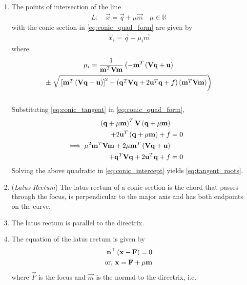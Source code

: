 \documentclass[journal,12pt,twocolumn]{IEEEtran}
\renewcommand\thesection{\arabic{section}}
\renewcommand\thesubsection{\thesection.\arabic{subsection}}
\begin{document}
\begin{enumerate}[label=\thesubsection.\arabic*.,ref=\thesubsection.\theenumi]
\item The points of intersection of the line 
\begin{align}
L: \quad \vec{x} = \vec{q} + \mu \vec{m} \quad \mu \in \mathbb{R}
\label{eq:conic_tangent}
\end{align}
with the conic section in \eqref{eq:conic_quad_form} are given by
\begin{align}
\vec{x}_i = \vec{q} + \mu_i \vec{m}
\label{eq:conic_tangent_pts}
\end{align}
%
where
{\tiny
\begin{multline}
\mu_i = \frac{1}
{
\mathbf{m}^T\mathbf{V}\mathbf{m}
}
\left(-\mathbf{m}^T\left(\mathbf{V}\mathbf{q}+\mathbf{u}\right)\right.
\\
\pm
\left.\sqrt{
{}\left[
\mathbf{m}^T\left(\mathbf{V}\mathbf{q}+\mathbf{u}\right)
\right]^2
-
\left(
\mathbf{q}^T\mathbf{V}\mathbf{q} + 2\mathbf{u}^T\mathbf{q} +f
\right)
\left(\mathbf{m}^T\mathbf{V}\mathbf{m}\right)
}
\right)
\label{eq:tangent_roots}
\end{multline}
}
\\
\solution 
Substituting \eqref{eq:conic_tangent}
in \eqref{eq:conic_quad_form}, 
\begin{align}
\left(\mathbf{q} + \mu \mathbf{m}\right)^T\mathbf{V}\left(\mathbf{q} + \mu \mathbf{m}\right)  
\\
+ 2 \mathbf{u}^T\left(\mathbf{q} + \mu \mathbf{m}\right)+f &= 0
\\
\implies \mu^2\mathbf{m}^T\mathbf{V}\mathbf{m} + 2 \mu\mathbf{m}^T\left(\mathbf{V}\mathbf{q}+\mathbf{u}\right) 
\\
+ \mathbf{q}^T\mathbf{V}\mathbf{q} + 2\mathbf{u}^T\mathbf{q} +f &= 0
\label{eq:conic_intercept}
\end{align}
Solving the above quadratic in \eqref{eq:conic_intercept}
yields \eqref{eq:tangent_roots}.
  \item ({\em Latus Rectum}) The latus rectum of a conic section is the chord that passes through the focus, is perpendicular to the major axis and has both endpoints on the curve.
  \item The latus rectum is parallel to the directrix.
  \item The equation of the latus rectum is given by 
\begin{align}
	 \mathbf{n}^{\top}\left(\mathbf{x}-\mathbf{F}\right) = 0
	\\
	\text{or, }\mathbf{x} = \mathbf{F} + \mu\mathbf{m}
\end{align}
where $\vec{F}$ is the focus and $\vec{m}$  is the normal to the directrix, i.e.
\begin{align}

\end{align}
\end{enumerate}
\end{document}
